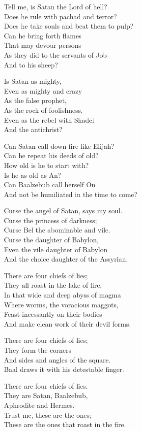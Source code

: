 \documentclass[
]{book}
\begin{document}
Tell me, is Satan the Lord of hell?\\
Does he rule with pachad and terror?\\
Does he take souls and beat them to pulp?\\
Can he bring forth flames\\
That may devour persons\\
As they did to the servants of Job\\
And to his sheep?

Is Satan as mighty,\\
Even as mighty and crazy\\
As the false prophet,\\
As the rock of foolishness,\\
Even as the rebel with Shadel\\
And the antichrist?

Can Satan call down fire like Elijah?\\
Can he repeat his deeds of old?\\
How old is he to start with?\\
Is he as old as An?\\
Can Baalzebub call herself On\\
And not be humiliated in the time to come?

Curse the angel of Satan, says my soul.\\
Curse the princess of darkness;\\
Curse Bel the abominable and vile.\\
Curse the daughter of Babylon,\\
Even the vile daughter of Babylon\\
And the choice daughter of the Assyrian.

There are four chiefs of lies;\\
They all roast in the lake of fire,\\
In that wide and deep abyss of magma\\
Where worms, the voracious maggots,\\
Feast incessantly on their bodies\\
And make clean work of their devil forms.

There are four chiefs of lies;\\
They form the corners\\
And sides and angles of the square.\\
Baal draws it with his detestable finger.

There are four chiefs of lies.\\
They are Satan, Baalzebub,\\
Aphrodite and Hermes.\\
Trust me, these are the ones;\\
These are the ones that roast in the fire.
\end{document}
